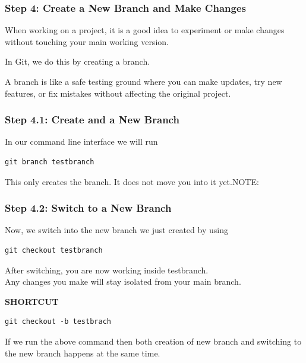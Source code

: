 \documentclass[
  11pt,
  a4paper,
]{article}
\begin{document}
\newpage

\subsubsection{Step 4: Create a New Branch and Make
Changes}\label{step-4-create-a-new-branch-and-make-changes}

When working on a project, it is a good idea to experiment or make
changes without touching your main working version.

In Git, we do this by creating a branch.

A branch is like a safe testing ground where you can make updates, try
new features, or fix mistakes without affecting the original project.

\subsubsection{Step 4.1: Create and a New
Branch}\label{step-4.1-create-and-a-new-branch}

In our command line interface we will run

\begin{verbatim}
git branch testbranch
\end{verbatim}

This only creates the branch. It does not move you into it yet.NOTE:

\subsubsection{Step 4.2: Switch to a New
Branch}\label{step-4.2-switch-to-a-new-branch}

Now, we switch into the new branch we just created by using

\begin{verbatim}
git checkout testbranch
\end{verbatim}

After switching, you are now working inside testbranch.\\
Any changes you make will stay isolated from your main branch.

\textbf{SHORTCUT}

\begin{verbatim}
git checkout -b testbrach 
\end{verbatim}

If we run the above command then both creation of new branch and
switching to the new branch happens at the same time.
\end{document}
